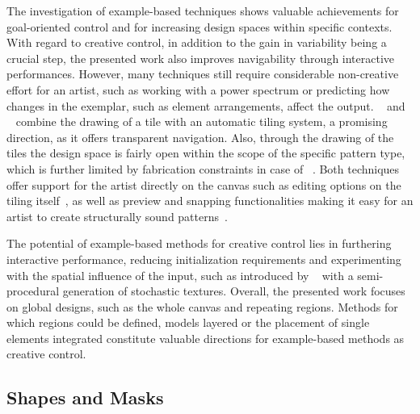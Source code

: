 The investigation of example-based techniques shows valuable achievements for goal-oriented control and for increasing design spaces within specific contexts. With regard to creative control, in addition to the gain in variability being a crucial step, the presented work also improves navigability through interactive performances. However, many techniques still require considerable non-creative effort for an artist, such as working with a power spectrum or predicting how changes in the exemplar, such as element arrangements, affect the output. \citeauthor*{tu_2020_cct}~\cite{tu_2020_cct} and \citeauthor*{bian_2018_tpd}~\cite{bian_2018_tpd} combine the drawing of a tile with an automatic tiling system, a promising direction, as it offers transparent navigation. Also, through the drawing of the tiles the design space is fairly open within the scope of the specific pattern type, which is further limited by fabrication constraints in case of \citeauthor*{bian_2018_tpd}~\cite{bian_2018_tpd}. Both techniques offer support for the artist directly on the canvas such as editing options on the tiling itself~\cite{tu_2020_cct}, as well as preview and snapping functionalities making it easy for an artist to create structurally sound patterns~\cite{bian_2018_tpd}. 

The potential of example-based methods for creative control lies in furthering interactive performance, reducing initialization requirements and experimenting with the spatial influence of the input, such as introduced by \citeauthor*{guehl_2020_stu}~\cite{guehl_2020_stu} with a semi-procedural generation of stochastic textures. Overall, the presented work focuses on global designs, such as the whole canvas and repeating regions. Methods for which regions could be defined, models layered or the placement of single elements integrated constitute valuable directions for example-based methods as creative control.


\subsection{Shapes and Masks}
\label{subsubsec:analysis_creative_means_shapes}

